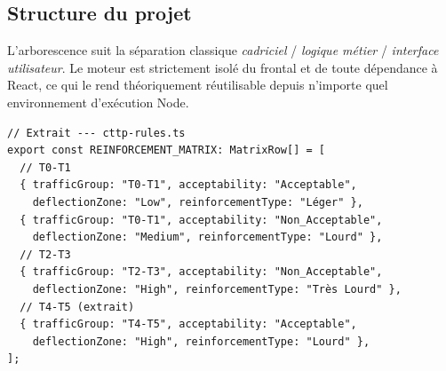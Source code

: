 \subsection{Structure du projet}
\label{sec:structure}

L'arborescence suit la séparation classique \emph{cadriciel} /
\emph{logique métier} / \emph{interface utilisateur}. Le moteur
\cttp{} est strictement isolé du frontal et de toute dépendance à
React, ce qui le rend théoriquement réutilisable depuis n'importe quel
environnement d'exécution Node.

\begin{lstlisting}[style=tsstyle,caption={Module central des règles \cttp{}
(cttp-rules.ts).},label={lst:rules}]
// Extrait --- cttp-rules.ts
export const REINFORCEMENT_MATRIX: MatrixRow[] = [
  // T0-T1
  { trafficGroup: "T0-T1", acceptability: "Acceptable",
    deflectionZone: "Low", reinforcementType: "Léger" },
  { trafficGroup: "T0-T1", acceptability: "Non_Acceptable",
    deflectionZone: "Medium", reinforcementType: "Lourd" },
  // T2-T3
  { trafficGroup: "T2-T3", acceptability: "Non_Acceptable",
    deflectionZone: "High", reinforcementType: "Très Lourd" },
  // T4-T5 (extrait)
  { trafficGroup: "T4-T5", acceptability: "Acceptable",
    deflectionZone: "High", reinforcementType: "Lourd" },
];
\end{lstlisting}

